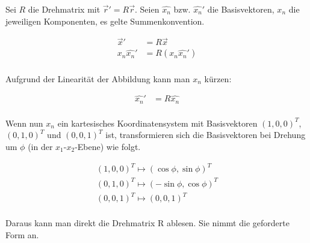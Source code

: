 \documentclass[a4paper,german,12pt,smallheadings]{scrartcl}
\begin{document}
Sei $R$ die Drehmatrix mit $\vec{r}' = R\vec{r}$. Seien $\widehat{x_n}$ bzw.
$\widehat{x_n}'$ die Basisvektoren, $x_n$ die jeweiligen Komponenten, es gelte
Summenkonvention.

\begin{align*}
  \vec{x}' &= R \vec{x} \\
  x_n\widehat{x_n}' &= R(x_n\widehat{x_n}') \\
\end{align*}

Aufgrund der Linearität der Abbildung kann man $x_n$ kürzen:

\begin{align*}
  \widehat{x_n}' &= R\widehat{x_n} \\
\end{align*}

Wenn nun $x_n$ ein kartesisches Koordinatensystem mit Basisvektoren
$(1,0,0)^T$, $(0,1,0)^T$ und $(0,0,1)^T$ ist, transformieren sich die
Basisvektoren bei Drehung um $\phi$ (in der $x_1$-$x_2$-Ebene) wie folgt.

\begin{align*}
  (1, 0, 0)^T \mapsto (\cos \phi, \sin \phi)^T \\
  (0, 1, 0)^T \mapsto (-\sin \phi, \cos \phi)^T \\
  (0, 0, 1)^T \mapsto (0,0,1)^T \\
\end{align*}

Daraus kann man direkt die Drehmatrix R ablesen. Sie nimmt die geforderte Form
an.
\end{document}
